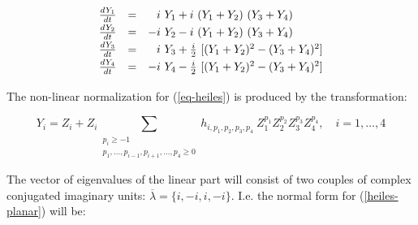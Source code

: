 \begin{equation}
\label{heiles-planar}
\begin{array}{lcrl}
\frac{\mathstrut dY_1}{\mathstrut dt}& = &  i &\!\!\!\! Y_1 + i \ (Y_1 + Y_2)\ 
                                                                 (Y_3 + Y_4)\\
\frac{\mathstrut dY_2}{\mathstrut dt}& = & -i &\!\!\!\! Y_2 - i \ (Y_1 + Y_2)\ 
                                                                 (Y_3 + Y_4)\\
\frac{\mathstrut dY_3}{\mathstrut dt}& = &  i &\!\!\!\! Y_3 + {i \over 2}\ [  
                                                                 (Y_1 + Y_2)^2 
                                                           - (Y_3 + Y_4)^2 ]\\
\frac{\mathstrut dY_4}{\mathstrut dt}& = & -i &\!\!\!\! Y_4 - {i \over 2}\ [  
                                                                 (Y_1 + Y_2)^2 
                                                           - (Y_3 + Y_4)^2 ]
\end{array}
\end{equation}

   The non-linear normalization for (\ref{eq-heiles}) is produced by the 
transformation:


\begin{equation}
\label{normal-tran}
Y_i = Z_i + Z_i
                       \!\!\!\!\!\!\!\!\!\!\!\!\!\!\!\!\!
                       \!\!\!\!\!\!\!\!\!\!\!\!\!\!\!\!\!
                       \sum_{\begin{array}{c}
                                    p_i \geq -1 \\
                           p_1,\ldots,p_{i-1},p_{i+1},\ldots,p_4 \geq 0 
                                          \end{array}}
                                   \!\!\!\!\!\!\!\!\!\!\!\!\!\!\!\!
                                   \!\!\!\!\!\!\!\!\!\!\!\!\!\!\!\!
                                    h_{i,p_1,p_2,p_3,p_4}
                           \ Z_1^{p_1}Z_2^{p_2}Z_3^{p_3}Z_4^{p_4},
\quad i=1,\ldots ,4
\end{equation}

    The vector of eigenvalues of the linear part will consist of two
 couples of
complex conjugated imaginary units: $ \overline{\lambda} = 
\{i,-i,i,-i\}$. I.e.
the normal form for (\ref{heiles-planar}) will be:


